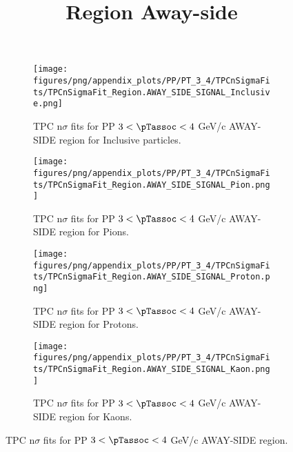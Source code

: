             \begin{figure}[H]
                \title{Region Away-side}
                \begin{subfigure}[b]{0.5\textwidth}
                    \centering
                    \texttt{[image: figures/png/appendix\_plots/PP/PT\_3\_4/TPCnSigmaFits/TPCnSigmaFit\_Region.AWAY\_SIDE\_SIGNAL\_Inclusive.png]}
                    \caption{TPC n$\sigma$ fits for PP $3 < \pTassoc < 4$ GeV/c AWAY-SIDE region for Inclusive particles.}
                    \label{fig:appendix_PP_$3 < \pTassoc < 4$ GeV/c_AWAY_SIDE_SIGNAL_Inclusive}
                \end{subfigure}
                \begin{subfigure}[b]{0.5\textwidth}
                    \centering
                    \texttt{[image: figures/png/appendix\_plots/PP/PT\_3\_4/TPCnSigmaFits/TPCnSigmaFit\_Region.AWAY\_SIDE\_SIGNAL\_Pion.png]}
                    \caption{TPC n$\sigma$ fits for PP $3 < \pTassoc < 4$ GeV/c AWAY-SIDE region for Pions.}
                    \label{fig:appendix_PP_$3 < \pTassoc < 4$ GeV/c_AWAY_SIDE_SIGNAL_Pion}
                \end{subfigure}
                \begin{subfigure}[b]{0.5\textwidth}
                    \centering
                    \texttt{[image: figures/png/appendix\_plots/PP/PT\_3\_4/TPCnSigmaFits/TPCnSigmaFit\_Region.AWAY\_SIDE\_SIGNAL\_Proton.png]}
                    \caption{TPC n$\sigma$ fits for PP $3 < \pTassoc < 4$ GeV/c AWAY-SIDE region for Protons.}
                    \label{fig:appendix_PP_$3 < \pTassoc < 4$ GeV/c_AWAY_SIDE_SIGNAL_Proton}
                \end{subfigure}
                \begin{subfigure}[b]{0.5\textwidth}
                    \centering
                    \texttt{[image: figures/png/appendix\_plots/PP/PT\_3\_4/TPCnSigmaFits/TPCnSigmaFit\_Region.AWAY\_SIDE\_SIGNAL\_Kaon.png]}
                    \caption{TPC n$\sigma$ fits for PP $3 < \pTassoc < 4$ GeV/c AWAY-SIDE region for Kaons.}
                    \label{fig:appendix_PP_$3 < \pTassoc < 4$ GeV/c_AWAY_SIDE_SIGNAL_Kaon}
                \end{subfigure}
                \caption{TPC n$\sigma$ fits for PP $3 < \pTassoc < 4$ GeV/c AWAY-SIDE region.}
                \label{fig:appendix_PP_$3 < \pTassoc < 4$ GeV/c_AWAY_SIDE_SIGNAL}
            \end{figure}

